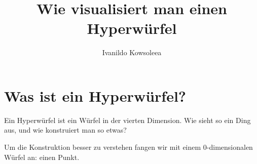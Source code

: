 \documentclass[10pt,a4paper,twoside,titlepage]{article}
\author{Ivanildo Kowsoleea}
\title{Wie visualisiert man einen Hyperwürfel}
\begin{document}
\maketitle
\leading{13pt}
\parindent{2pt}

\section{Was ist ein Hyperwürfel?}
Ein Hyperwürfel ist ein Würfel in der vierten Dimension. Wie sieht so
ein Ding aus, und wie konstruiert man so etwas?

Um die Konstruktion besser zu verstehen fangen wir mit einem 0-dimensionalen
Würfel an: einen Punkt.
\end{document}
